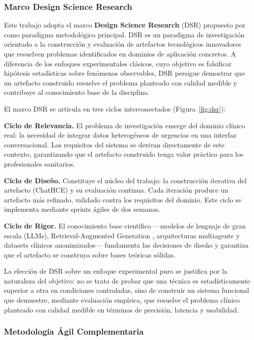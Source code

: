 \subsubsection{Marco Design Science Research}

Este trabajo adopta el marco \textbf{Design Science Research} (DSR) propuesto por \citet{Hevner2004} como paradigma metodológico principal. DSR es un paradigma de investigación orientado a la construcción y evaluación de artefactos tecnológicos innovadores que resuelven problemas identificados en dominios de aplicación concretos. A diferencia de los enfoques experimentales clásicos, cuyo objetivo es falsificar hipótesis estadísticas sobre fenómenos observables, DSR persigue demostrar que un artefacto construido resuelve el problema planteado con calidad medible y contribuye al conocimiento base de la disciplina.

El marco DSR se articula en tres ciclos interconectados (Figura~\ref{fig:dsr}):

\textbf{Ciclo de Relevancia.} El problema de investigación emerge del dominio clínico real: la necesidad de integrar datos heterogéneos de urgencias en una interfaz conversacional. Los requisitos del sistema se derivan directamente de este contexto, garantizando que el artefacto construido tenga valor práctico para los profesionales sanitarios.

\textbf{Ciclo de Diseño.} Constituye el núcleo del trabajo: la construcción iterativa del artefacto (ChatHCE) y su evaluación continua. Cada iteración produce un artefacto más refinado, validado contra los requisitos del dominio. Este ciclo se implementa mediante sprints ágiles de dos semanas.

\textbf{Ciclo de Rigor.} El conocimiento base científico —modelos de lenguaje de gran escala (LLMs), Retrieval-Augmented Generation \citep{Lewis2020}, arquitecturas multiagente y datasets clínicos anonimizados— fundamenta las decisiones de diseño y garantiza que el artefacto se construya sobre bases teóricas sólidas.

La elección de DSR sobre un enfoque experimental puro se justifica por la naturaleza del objetivo: no se trata de probar que una técnica es estadísticamente superior a otra en condiciones controladas, sino de construir un sistema funcional que demuestre, mediante evaluación empírica, que resuelve el problema clínico planteado con calidad medible en términos de precisión, latencia y usabilidad.

\subsubsection{Metodología Ágil Complementaria}


